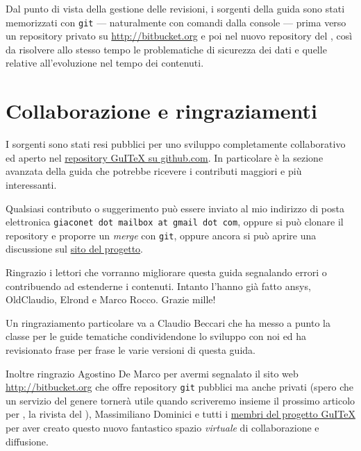 Dal punto di vista della gestione delle revisioni, i sorgenti della guida sono
stati memorizzati con \texttt{git} --- naturalmente con comandi dalla console
--- prima verso un repository privato su \url{http://bitbucket.org} e poi nel
nuovo repository del \GuIT*, così da
risolvere allo stesso tempo le problematiche di sicurezza dei dati e quelle
relative all'evoluzione nel tempo dei contenuti.

\section{Collaborazione e ringraziamenti}

I sorgenti sono stati resi pubblici per uno sviluppo completamente collaborativo
ed aperto nel \href{https://github.com/GuITeX/guidalineadicomando}{repository GuITeX su github.com}.
In particolare è la sezione avanzata della guida che potrebbe ricevere i contributi
maggiori e più interessanti.

Qualsiasi contributo o suggerimento può essere inviato al mio indirizzo di posta
elettronica \texttt{giaconet dot mailbox at gmail dot com}, oppure si può
clonare il repository e proporre un \emph{merge} con \texttt{git}, oppure ancora si può
aprire una discussione sul \href{https://github.com/GuITeX/guidalineadicomando/issues/new}{sito del progetto}.

Ringrazio i lettori che vorranno migliorare questa guida segnalando errori o
contribuendo ad estenderne i contenuti. Intanto l'hanno già fatto
\textsf{ansys}, \textsf{OldClaudio}, \textsf{Elrond} e Marco Rocco. Grazie
mille!

Un ringraziamento particolare va a Claudio Beccari che ha messo a punto la
classe per le guide tematiche condividendone lo sviluppo con noi ed ha
revisionato frase per frase le varie versioni di questa guida.

Inoltre ringrazio Agostino De Marco per avermi segnalato il sito web
\url{http://bitbucket.org} che offre repository \texttt{git} pubblici ma anche
privati (spero che un servizio del genere tornerà utile quando scriveremo
insieme il prossimo articolo per \Ars, la rivista del \GuIT*), Massimiliano
Dominici e tutti i \href{https://github.com/GuITeX?tab=members}{membri del
progetto GuITeX} per aver creato questo nuovo fantastico spazio \emph{virtuale}
di collaborazione e diffusione.


